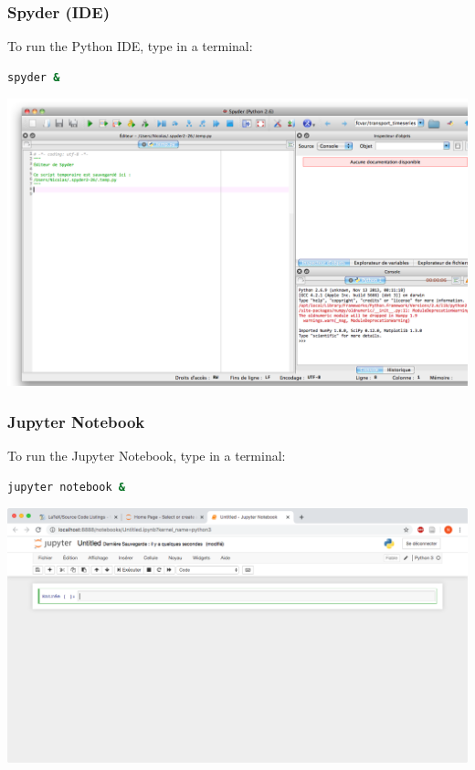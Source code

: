 \begin{frame}[fragile]
    \frametitle{Spyder (IDE)}
To run the Python IDE, type in a terminal:\\
\begin{lstlisting}[language=bash, basicstyle=\ttfamily\scriptsize]
spyder &
\end{lstlisting}
\vspace{-0.5em}
\begin{center}
\includegraphics[scale=0.2]{figs/spyder.png}
\end{center}
\end{frame}

\begin{frame}[fragile]
    \frametitle{Jupyter Notebook}
To run the Jupyter Notebook, type in a terminal:
\begin{lstlisting}[language=bash, basicstyle=\ttfamily\scriptsize]
jupyter notebook &
\end{lstlisting}
\vspace{-0.5em}
\begin{center}
\includegraphics[scale=0.25]{figs/notebook.png}
\end{center}
\end{frame}

